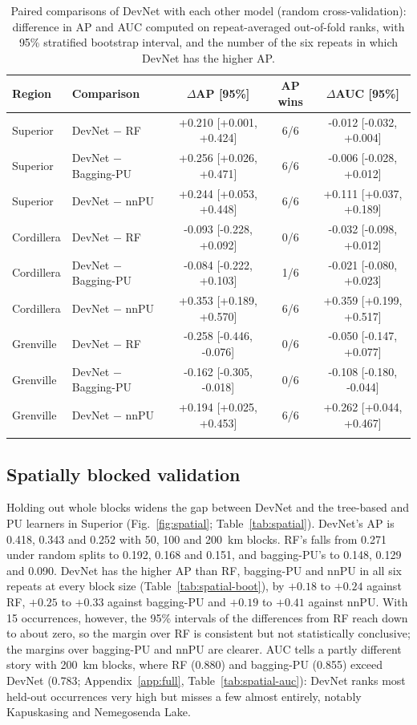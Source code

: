 \documentclass[pdflatex,sn-apa]{sn-jnl}
\begin{document}
\begin{table}[t]
\caption{Paired comparisons of DevNet with each other model (random cross-validation): difference in AP and AUC computed on repeat-averaged out-of-fold ranks, with 95\% stratified bootstrap interval, and the number of the six repeats in which DevNet has the higher AP.}\label{tab:bootstrap}
\footnotesize
\setlength{\tabcolsep}{3pt}
\begin{tabular*}{\textwidth}{@{\extracolsep\fill}llccc}
\toprule
Region & Comparison & $\Delta$AP [95\%] & AP wins & $\Delta$AUC [95\%] \\
\midrule
Superior & DevNet $-$ RF & +0.210 [+0.001, +0.424] & 6/6 & -0.012 [-0.032, +0.004] \\
Superior & DevNet $-$ Bagging-PU & +0.256 [+0.026, +0.471] & 6/6 & -0.006 [-0.028, +0.012] \\
Superior & DevNet $-$ nnPU & +0.244 [+0.053, +0.448] & 6/6 & +0.111 [+0.037, +0.189] \\
\addlinespace
Cordillera & DevNet $-$ RF & -0.093 [-0.228, +0.092] & 0/6 & -0.032 [-0.098, +0.012] \\
Cordillera & DevNet $-$ Bagging-PU & -0.084 [-0.222, +0.103] & 1/6 & -0.021 [-0.080, +0.023] \\
Cordillera & DevNet $-$ nnPU & +0.353 [+0.189, +0.570] & 6/6 & +0.359 [+0.199, +0.517] \\
\addlinespace
Grenville & DevNet $-$ RF & -0.258 [-0.446, -0.076] & 0/6 & -0.050 [-0.147, +0.077] \\
Grenville & DevNet $-$ Bagging-PU & -0.162 [-0.305, -0.018] & 0/6 & -0.108 [-0.180, -0.044] \\
Grenville & DevNet $-$ nnPU & +0.194 [+0.025, +0.453] & 6/6 & +0.262 [+0.044, +0.467] \\
\botrule
\end{tabular*}
\end{table}

\subsection{Spatially blocked validation}\label{sec:res-spatial}

Holding out whole blocks widens the gap between DevNet and the tree-based and PU learners in Superior (Fig.~\ref{fig:spatial}; Table~\ref{tab:spatial}). DevNet's AP is 0.418, 0.343 and 0.252 with 50, 100 and 200~km blocks. RF's falls from 0.271 under random splits to 0.192, 0.168 and 0.151, and bagging-PU's to 0.148, 0.129 and 0.090. DevNet has the higher AP than RF, bagging-PU and nnPU in all six repeats at every block size (Table~\ref{tab:spatial-boot}), by $+0.18$ to $+0.24$ against RF, $+0.25$ to $+0.33$ against bagging-PU and $+0.19$ to $+0.41$ against nnPU. With 15 occurrences, however, the 95\% intervals of the differences from RF reach down to about zero, so the margin over RF is consistent but not statistically conclusive; the margins over bagging-PU and nnPU are clearer. AUC tells a partly different story with 200~km blocks, where RF (0.880) and bagging-PU (0.855) exceed DevNet (0.783; Appendix~\ref{app:full}, Table~\ref{tab:spatial-auc}): DevNet ranks most held-out occurrences very high but misses a few almost entirely, notably Kapuskasing and Nemegosenda Lake.
\end{document}
